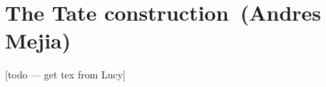 \renewcommand{\thespeaker}{Andres Mejia}
\renewcommand{\thetitle}{The Tate construction}
\section{\thetitle~(\thespeaker)}


[todo --- get tex from Lucy]
